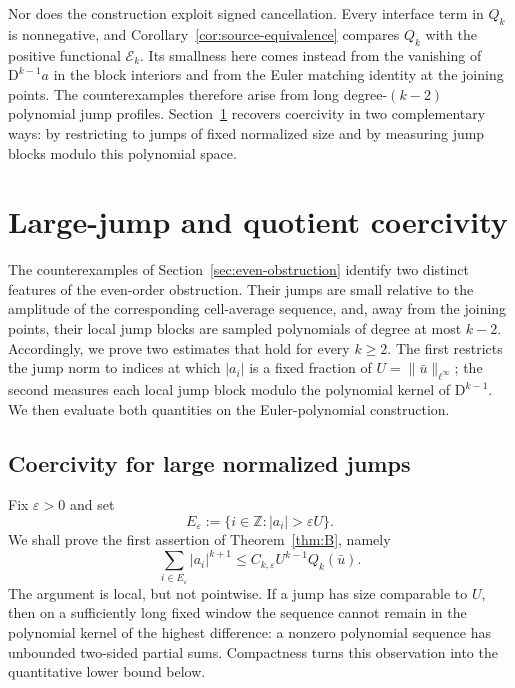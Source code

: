 \documentclass[11pt]{amsart}
\theoremstyle{plain}
\theoremstyle{definition}
\theoremstyle{remark}
\numberwithin{equation}{section}
\theoremstyle{plain}
\begin{document}
Nor does the construction exploit signed cancellation.  Every interface
term in $Q_k$ is nonnegative, and
Corollary~\ref{cor:source-equivalence} compares $Q_k$ with the positive
functional $\mathcal E_k$.  Its smallness here comes instead from the
vanishing of $\mathrm D^{k-1}a$ in the block interiors and from the
Euler matching identity at the joining points.  The counterexamples therefore arise from long
degree-$(k-2)$ polynomial jump profiles.
Section~\ref{sec:replacement-estimates} recovers coercivity in two
complementary ways: by restricting to jumps of fixed normalized size and by
measuring jump blocks modulo this polynomial space.


\section{Large-jump and quotient coercivity}
\label{sec:replacement-estimates}

The counterexamples of Section~\ref{sec:even-obstruction} identify two
distinct features of the even-order obstruction.  Their jumps are small
relative to the amplitude of the corresponding cell-average sequence,
and, away from the joining points,
their local jump blocks are sampled polynomials of degree at most $k-2$.
Accordingly, we prove two estimates that hold for every $k\ge2$.  The first
restricts the jump norm to indices at which $|a_i|$ is a fixed fraction of
$U=\|\bar u\|_{\ell^\infty}$; the second measures each local jump block
modulo the polynomial kernel of $\mathrm D^{k-1}$.  We then evaluate both
quantities on the Euler-polynomial construction.

\subsection{Coercivity for large normalized jumps}
\label{sec:large-jump-coercivity}

Fix $\varepsilon>0$ and set
\begin{equation}\label{eq:large-jump-set}
	E_\varepsilon
	:=\{i\in\mathbb Z:|a_i|>\varepsilon U\}.
\end{equation}
We shall prove the first assertion of Theorem~\ref{thm:B}, namely
\begin{equation}\label{eq:large-jump-target-section5}
	\sum_{i\in E_\varepsilon}|a_i|^{k+1}
	\le C_{k,\varepsilon}U^{k-1}Q_k(\bar u).
\end{equation}
The argument is local, but not pointwise.  If a jump has size comparable to
$U$, then on a sufficiently long fixed window the sequence cannot remain in
the polynomial kernel of the highest difference: a nonzero polynomial
sequence has unbounded two-sided partial sums.  Compactness turns this
observation into the quantitative lower bound below.
\end{document}
